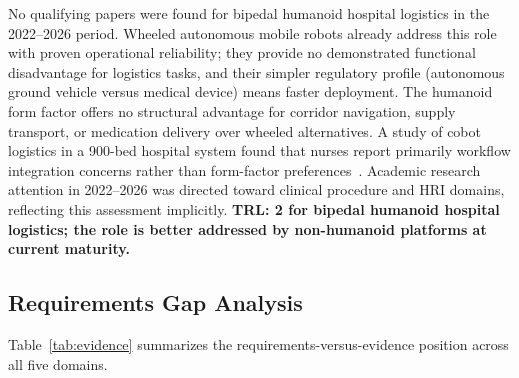 No qualifying papers were found for bipedal humanoid hospital logistics in the
2022--2026 period. Wheeled autonomous mobile robots already address this role
with proven operational reliability; they provide no demonstrated functional
disadvantage for logistics tasks, and their simpler regulatory profile
(autonomous ground vehicle versus medical device) means faster deployment.
The humanoid form factor offers no structural advantage for corridor navigation,
supply transport, or medication delivery over wheeled alternatives. A study of cobot logistics in a 900-bed hospital system found that nurses
report primarily workflow integration concerns rather than form-factor
preferences~\cite{birkhoff2024integrating}. Academic research attention in
2022--2026 was directed toward clinical procedure and HRI domains, reflecting this assessment implicitly. \textbf{TRL: 2 for bipedal
humanoid hospital logistics; the role is better addressed by non-humanoid
platforms at current maturity.}

\subsection{Requirements Gap Analysis}
\label{sec:crossdomain}

Table~\ref{tab:evidence} summarizes the requirements-versus-evidence position
across all five domains.

